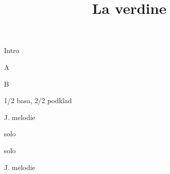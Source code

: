 \documentclass[timestamp]{jazzgrid}
\title{La verdine}
\begin{document}
\maketitle
\begin{musicsection}{Intro}
\barline
	{}
	{}
	{}
	{}
\barline
	{}
	{}
	{}
	{}
\end{musicsection}
\begin{musicsection}{A}
\barline
	{}
	{}
	{}
	{}
\barline
	{}
	{}
	{}
	{}
	{}
	{}
	{}
	{}
\end{musicsection}
\begin{musicsection}{B}
\barline
	{}
	{}
	{}
	{}
\barline
	{}
	{}
	{}
	{}
\end{musicsection}

\footnotesize
\begin{description}[noitemsep,align=right,labelwidth=\widthof{\bfseries{AABA}}]
	\item [Intro] 1/2 basa, 2/2 podklad
	\item [AABA] J. melodie
	\item [AABA] solo
	\item [AABA] solo
	\item [AABA] J. melodie
\end{description}
\end{document}
